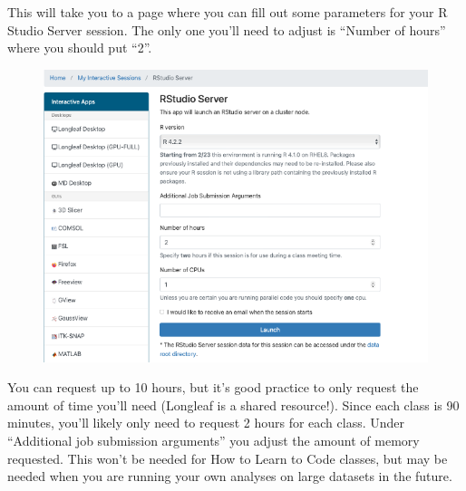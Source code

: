 \documentclass[
  letterpaper,
  DIV=11,
  numbers=noendperiod]{scrreprt}
\begin{document}
This will take you to a page where you can fill out some parameters for
your R Studio Server session. The only one you'll need to adjust is
``Number of hours'' where you should put ``2''.

\begin{figure}

{\centering \includegraphics{scripts/00_intro/class0_images/Picture2.png}

}

\end{figure}

\begin{tcolorbox}[enhanced jigsaw, left=2mm, colframe=quarto-callout-note-color-frame, leftrule=.75mm, opacitybacktitle=0.6, toptitle=1mm, title=\textcolor{quarto-callout-note-color}{\faInfo}\hspace{0.5em}{Note}, opacityback=0, coltitle=black, colbacktitle=quarto-callout-note-color!10!white, breakable, colback=white, titlerule=0mm, bottomrule=.15mm, arc=.35mm, bottomtitle=1mm, rightrule=.15mm, toprule=.15mm]

You can request up to 10 hours, but it's good practice to only request
the amount of time you'll need (Longleaf is a shared resource!). Since
each class is 90 minutes, you'll likely only need to request 2 hours for
each class. Under ``Additional job submission arguments'' you adjust the
amount of memory requested. This won't be needed for How to Learn to
Code classes, but may be needed when you are running your own analyses
on large datasets in the future.

\end{tcolorbox}
\end{document}
